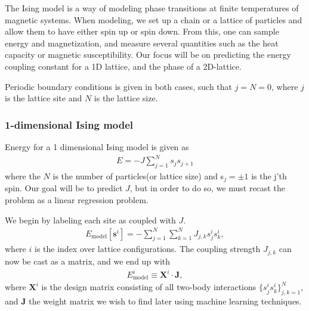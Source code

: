 The Ising model is a way of modeling phase transitions at finite temperatures of magnetic systems. When modeling, we set up a chain or a lattice of particles and allow them to have either spin up or spin down. From this, one can sample energy and magnetization, and measure several quantities such as the heat capacity or magnetic susceptibility. Our focus will be on predicting the energy coupling constant for a 1D lattice, and the phase of a 2D-lattice.

Periodic boundary conditions is given in both cases, such that $j=N=0$, where $j$ is the lattice site and $N$ is the lattice size.

\subsubsection{1-dimensional Ising model} \label{sec:1d-ising-model}
Energy for a 1 dimensional Ising model is given as
\begin{align}
    E = - J\sum^N_{j=1} s_j s_{j+1}
    \label{eq:1d-ising-energy}
\end{align}
where the $N$ is the number of particles(or lattice size) and s$_j=\pm1$ is the j'th spin. Our goal will be to predict $J$, but in order to do so, we must recast the problem as a linear regression problem.

We begin by labeling each site as coupled with $J$.
\begin{align}
    E_\mathrm{model}[\bm{s}^i] = -\sum^N_{j=1} \sum^N_{k=1} J_{j,k} s^i_j s^i_k,
\end{align}
where $i$ is the index over lattice configurations. The coupling strength $J_{j,k}$  can now be cast as a matrix, and we end up with
\begin{align}
    E_\mathrm{model}^i \equiv \bm{X}^i \cdot \bm{J},
    \label{eq:1d-ising-linreg}
\end{align}
where $\bm{X}^i$ is the design matrix consisting of all two-body interactions $\{s^i_j s^i_k\}^N_{j,k=1}$, and $\bm{J}$ the weight matrix we wish to find later using machine learning techniques.

